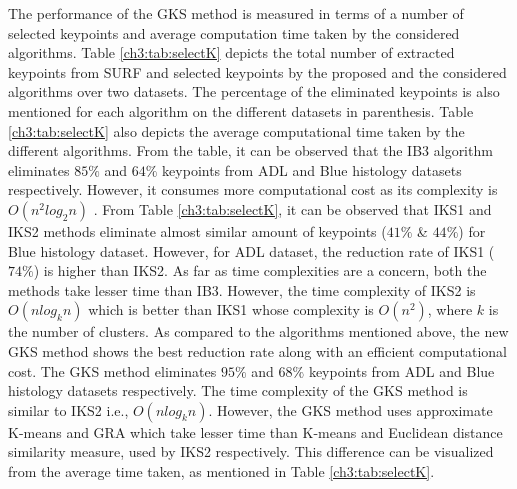 The performance of the GKS method is measured in terms of a number of selected keypoints and average computation time taken by the considered algorithms. Table \ref{ch3:tab:selectK} depicts the total number of extracted keypoints from SURF and selected keypoints by the proposed and the considered algorithms over two datasets. The percentage of the eliminated keypoints is also mentioned for each algorithm on the different datasets in parenthesis. Table \ref{ch3:tab:selectK} also depicts the average computational time taken by the different algorithms. From the table, it can be observed that the IB3 algorithm eliminates $85\%$ and $64\%$  keypoints from ADL and Blue histology datasets respectively. However, it consumes more computational cost as its complexity is $O(n^2log_2n)$ \cite{aha1991}. From Table \ref{ch3:tab:selectK}, it can be observed that IKS1 and IKS2 methods eliminate almost similar amount of keypoints ($41\%$ \& $44\%$) for Blue histology dataset. However, for ADL dataset, the reduction rate of IKS1 ($74\%$) is higher than IKS2.  As far as time complexities are a concern, both the methods take lesser time than IB3. However, the time complexity of IKS2 is $O(nlog_kn)$ which is better than IKS1 whose complexity is $O(n^2)$, where $k$ is the number of clusters. As compared to the algorithms mentioned above, the new GKS method shows the best reduction rate along with an efficient computational cost. The GKS method eliminates $95\%$ and $68\%$ keypoints from ADL and Blue histology datasets respectively. The time complexity of the GKS method is similar to IKS2 i.e., $O(nlog_kn)$. However, the GKS method uses approximate K-means and GRA which take lesser time than K-means and Euclidean distance similarity measure, used by IKS2 respectively. This difference can be visualized from the average time taken, as mentioned in Table \ref{ch3:tab:selectK}.


